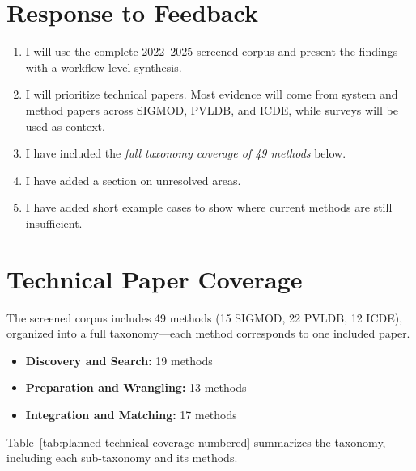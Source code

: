\documentclass[sigconf]{acmart}
\begin{document}
\section{Response to Feedback}
\begin{enumerate}[leftmargin=*,itemsep=4pt,topsep=1pt,partopsep=0pt,parsep=0pt]
  \item 
  I will use the complete 2022--2025 screened corpus and present the findings with a workflow-level synthesis.

  \item 
  I will prioritize technical papers. Most evidence will come from system and method papers across SIGMOD, PVLDB, and ICDE, while surveys will be used as context.

  \item 
  I have included the \emph{full taxonomy coverage of 49 methods} below.

  \item
  I have added a section on unresolved areas.

  \item
  I have added short example cases to show where current methods are still insufficient.
\end{enumerate}

\section{Technical Paper Coverage}
The screened corpus includes 49 methods (15 SIGMOD, 22 PVLDB, 12 ICDE), organized into a full taxonomy---each method corresponds to one included paper.
\begin{itemize}[leftmargin=*,itemsep=2pt]
  \item \textbf{Discovery and Search:} 19 methods
  \item \textbf{Preparation and Wrangling:} 13 methods
  \item \textbf{Integration and Matching:} 17 methods
\end{itemize}
Table~\ref{tab:planned-technical-coverage-numbered} summarizes the taxonomy, including each sub-taxonomy and its methods.
\end{document}

